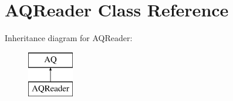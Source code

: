 \hypertarget{class_a_q_reader}{}\section{A\+Q\+Reader Class Reference}
\label{class_a_q_reader}
Inheritance diagram for A\+Q\+Reader\+:\begin{figure}[H]
\begin{center}
\leavevmode
\includegraphics[height=2.000000cm]{class_a_q_reader}
\end{center}
\end{figure}
